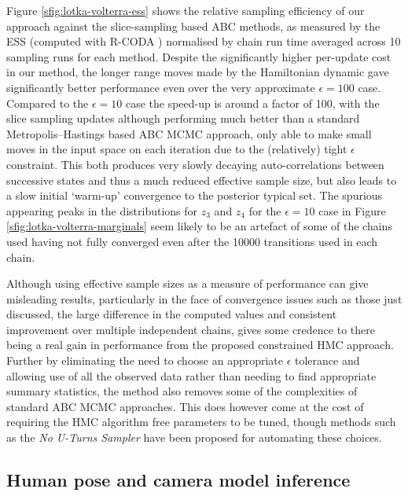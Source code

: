 Figure \ref{sfig:lotka-volterra-ess} shows the relative sampling efficiency of our approach against the slice-sampling based \ac{ABC} methods, as measured by the \ac{ESS} (computed with R-CODA \citep{plummer2006coda}) normalised by chain run time averaged across 10 sampling runs for each method. Despite the significantly higher per-update cost in our method, the longer range moves made by the Hamiltonian dynamic gave significantly better performance even over the very approximate $\epsilon=100$ case. Compared to the $\epsilon = 10$ case the speed-up is around a factor of 100, with the slice sampling updates although performing much better than a standard Metropolis--Hastings based \ac{ABC} \ac{MCMC} approach, only able to make small moves in the input space on each iteration due to the (relatively) tight $\epsilon$ constraint. This both produces very slowly decaying auto-correlations between successive states and thus a much reduced effective sample size, but also leads to a slow initial `warm-up' convergence to the posterior typical set. The spurious appearing peaks in the distributions for $z_3$ and $z_4$ for the $\epsilon = 10$ case in Figure \ref{sfig:lotka-volterra-marginals} seem likely to be an artefact of some of the chains used having not fully converged even after the 10000 transitions used in each chain.

Although using effective sample sizes as a measure of performance can give misleading results, particularly in the face of convergence issues such as those just discussed, the large difference in the computed values and consistent improvement over multiple independent chains, gives some credence to there being a real gain in performance from the proposed constrained \ac{HMC} approach. Further by eliminating the need to choose an appropriate $\epsilon$ tolerance and allowing use of all the observed data rather than needing to find appropriate summary statistics, the method also removes some of the complexities of standard \ac{ABC} \ac{MCMC} approaches. This does however come at the cost of requiring the \ac{HMC} algorithm free parameters to be tuned, though methods such as the \emph{No U-Turns Sampler} \citep{hoffman2014no} have been proposed for automating these choices.

\subsection{Human pose and camera model inference}

